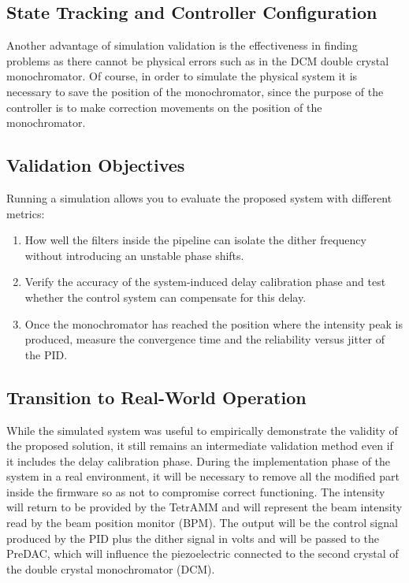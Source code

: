 \subsection{State Tracking and Controller Configuration}

Another advantage of simulation validation is the effectiveness in finding problems as there cannot be physical errors such as in the DCM double crystal monochromator.
Of course, in order to simulate the physical system it is necessary to save the position of the monochromator, since the purpose of the controller is to make correction movements on the position of the monochromator.

\subsection{Validation Objectives}
Running a simulation allows you to evaluate the proposed system with different metrics:
\begin{enumerate}
    \item How well the filters inside the pipeline can isolate the dither frequency without introducing an unstable phase shifts.
    \item Verify the accuracy of the system-induced delay calibration phase and test whether the control system can compensate for this delay.
    \item Once the monochromator has reached the position where the intensity peak is produced, measure the convergence time and the reliability versus jitter of the PID.
\end{enumerate}

\subsection{Transition to Real-World Operation}
While the simulated system was useful to empirically demonstrate the validity of the proposed solution, it still remains an intermediate validation method even if it includes the delay calibration phase.
During the implementation phase of the system in a real environment, it will be necessary to remove all the modified part inside the firmware so as not to compromise correct functioning.
The intensity will return to be provided by the TetrAMM and will represent the beam intensity read by the beam position monitor (BPM). 
The output will be the control signal produced by the PID plus the dither signal in volts and will be passed to the PreDAC, which will influence the piezoelectric connected to the second crystal of the double crystal monochromator (DCM).

